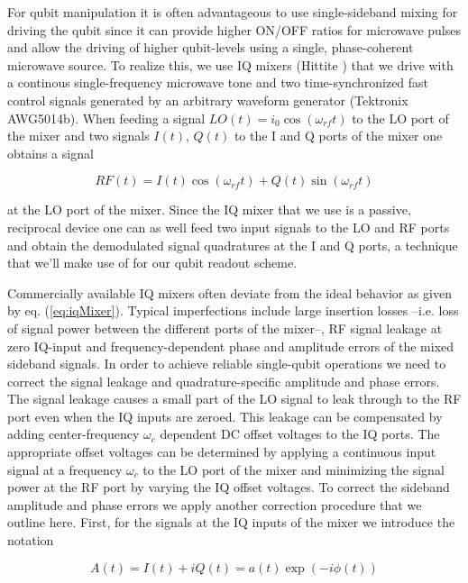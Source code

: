 For qubit manipulation it is often advantageous to use single-sideband mixing for driving the qubit since it can provide higher ON/OFF ratios for microwave pulses and allow the driving of higher qubit-levels using a single, phase-coherent microwave source. To realize this, we use IQ mixers (Hittite ) that we drive with a continous single-frequency microwave tone and two time-synchronized fast control signals generated by an arbitrary waveform generator (Tektronix AWG5014b). When feeding a signal $LO(t) = i_0 \cos{(\omega_{rf} t )}$ to the LO port of the mixer and two signals $I(t)$, $Q(t)$ to the I and Q ports of the mixer one obtains a signal

\begin{equation}
RF(t) = I(t)\cos{(\omega_{rf} t)}+Q(t)\sin{(\omega_{rf} t)} \label{eq:iqMixer}
\end{equation}

at the LO port of the mixer. Since the IQ mixer that we use is a passive, reciprocal device one can as well feed two input signals to the LO and RF ports and obtain the demodulated signal quadratures at the I and Q ports, a technique that we'll make use of for our qubit readout scheme.

Commercially available IQ mixers often deviate from the ideal behavior as given by eq. (\ref{eq:iqMixer}). Typical imperfections include large insertion losses --i.e. loss of signal power between the different ports of the mixer--, RF signal leakage at zero IQ-input and frequency-dependent phase and amplitude errors of the mixed sideband signals. In order to achieve reliable single-qubit operations we need to correct the signal leakage and quadrature-specific amplitude and phase errors. The signal leakage causes a small part of the LO signal to leak through to the RF port even when the IQ inputs are zeroed. This leakage can be compensated by adding center-frequency $\omega_c$ dependent DC offset voltages to the IQ ports. The appropriate offset voltages can be determined by applying a continuous input signal at a frequency $\omega_c$ to the LO port of the mixer and minimizing the signal power at the RF port by varying the IQ offset voltages. To correct the sideband amplitude and phase errors we apply another correction procedure that we outline here. First, for the signals at the IQ inputs of the mixer we introduce the notation

\begin{equation}
A(t) = I(t)+iQ(t) = a(t)\exp{(-i\phi(t))}
\end{equation}

